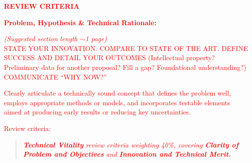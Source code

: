 
\begin{center}
    \large \textcolor{red}{\textbf{REVIEW CRITERIA}}
\end{center}
\vspace*{\baselineskip}

\textcolor{red}{\textbf{Problem, Hypothesis \& Technical Rationale:}}
\vspace*{0.5\baselineskip}

\textcolor{red}{\textit{(Suggested section length \(\sim \)1
    page)}}\\ \textcolor{red}{STATE YOUR INNOVATION. COMPARE TO STATE
  OF THE ART. DEFINE SUCCESS AND DETAIL YOUR OUTCOMES (Intellectual
  property? Preliminary data for another proposal? Fill a gap?
  Foundational understanding?)}\\ \textcolor{red}{COMMUNICATE “WHY
  NOW?”}
\vspace*{\baselineskip}

\textcolor{red}{Clearly articulate a technically sound concept that defines the problem well, employs appropriate methods or models, and incorporates testable elements aimed at producing early results or reducing key uncertainties.}
\vspace*{\baselineskip}

\textcolor{red}{Review criteria:}
\begin{quote}
\vspace{-0.3cm}
    \textcolor{red}{\textit{\textbf{Technical Vitality} review criteria weighting 40\%, covering \textbf{Clarity of Problem and Objectives} and \textbf{Innovation and Technical Merit.}}}
\end{quote}

